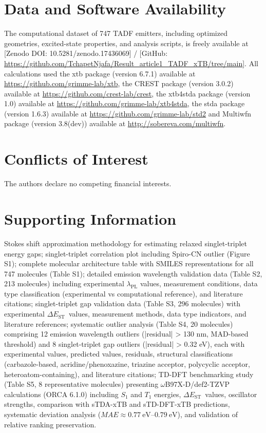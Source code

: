 \documentclass[journal=jcisd8,manuscript=article,keywords=true]{achemso}
\newcommand{\deltaest}{$\Delta E_{\text{ST}}$}
\begin{document}
\section*{Data and Software Availability}
The computational dataset of 747 TADF emitters, including optimized 
geometries, excited-state properties, and analysis scripts, is freely 
available at [Zenodo DOI: 10.5281/zenodo.17436069] / [GitHub:
\url{https://github.com/TchapetNjafa/Result_article1_TADF_xTB/tree/main}].
All calculations used the xtb package (version 6.7.1) available at 
\url{https://github.com/grimme-lab/xtb}, the CREST package (version 3.0.2) available at
\url{https://github.com/crest-lab/crest},
the xtb4stda package (version 1.0) available at
\url{https://github.com/grimme-lab/xtb4stda}, the stda package (version 1.6.3) available
at \url{https://github.com/grimme-lab/std2}
and Multiwfn package (version 3.8(dev)) available at \url{http://sobereva.com/multiwfn}.

\section*{Conflicts of Interest}
The authors declare no competing financial interests.


\section*{Supporting Information}
Stokes shift approximation methodology for estimating relaxed singlet-triplet energy gaps; singlet-triplet correlation plot including Spiro-CN outlier (Figure 
S1); complete molecular architecture table with SMILES representations for all 747 molecules (Table S1); detailed emission wavelength validation data (Table 
S2, 213 molecules) including experimental $\lambda_{\text{PL}}$ values, measurement conditions, data type classification (experimental 
vs computational reference), and literature citations; singlet-triplet gap validation data (Table S3, 296 molecules) with experimental \deltaest\, values, 
measurement methods, data type indicators, and literature references; systematic outlier analysis (Table S4, 20 molecules) comprising 12 emission wavelength 
outliers (|residual| > 130 nm, MAD-based threshold) and 8 singlet-triplet gap outliers (|residual| > 0.32 eV), each with experimental values, predicted values, 
residuals, structural classifications (carbazole-based, acridine/phenoxazine, triazine acceptor, polycyclic acceptor, heteroatom-containing), and literature 
citations; TD-DFT benchmarking study (Table S5, 8 representative molecules) presenting $\omega$B97X-D/def2-TZVP calculations (ORCA 6.1.0) including $S_1$ and 
$T_1$ energies, \deltaest\, values, oscillator strengths, comparison with sTDA-xTB and sTD-DFT-xTB predictions, systematic deviation analysis ($MAE\approx 
\qtyrange{0.77}{0.79}{\electronvolt}$), and validation of relative ranking preservation.
\end{document}
